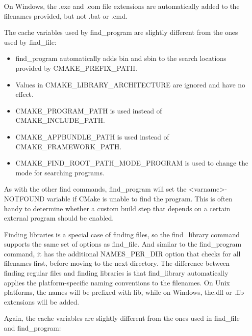 On Windows, the .exe and .com file extensions are automatically added to the filenames provided, but not .bat or .cmd.

The cache variables used by find\_program are slightly different from the ones used by find\_file:

\begin{itemize}
\item 
find\_program automatically adds bin and sbin to the search locations provided by CMAKE\_PREFIX\_PATH.

\item 
Values in CMAKE\_LIBRARY\_ARCHITECTURE are ignored and have no effect.

\item 
CMAKE\_PROGRAM\_PATH is used instead of CMAKE\_INCLUDE\_PATH.

\item 
CMAKE\_APPBUNDLE\_PATH is used instead of CMAKE\_FRAMEWORK\_PATH.

\item 
CMAKE\_FIND\_ROOT\_PATH\_MODE\_PROGRAM is used to change the mode for searching programs.
\end{itemize}

As with the other find commands, find\_program will set the <varname>-NOTFOUND variable if CMake is unable to find the program. This is often handy to determine whether a custom build step that depends on a certain external program should be enabled.


Finding libraries is a special case of finding files, so the find\_library command supports the same set of options as find\_file. And similar to the find\_program command, it has the additional NAMES\_PER\_DIR option that checks for all filenames first, before moving to the next directory. The difference between finding regular files and finding libraries is that find\_library automatically applies the platform-specific naming conventions to the filenames. On Unix platforms, the names will be prefixed with lib, while on Windows, the.dll or .lib extensions will be added.

Again, the cache variables are slightly different from the ones used in find\_file and find\_program:


